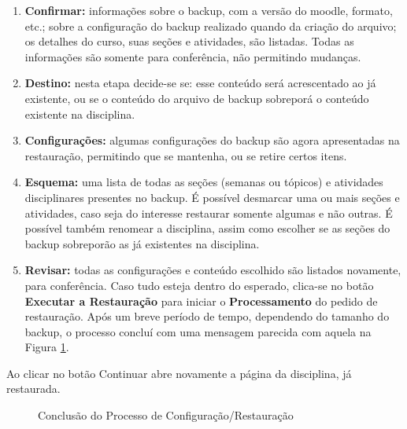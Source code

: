 \begin{enumerate}
 \item \textbf{Confirmar:} informações sobre o backup, com a versão do moodle, formato, etc.; sobre a configuração do backup realizado quando da criação do arquivo; os detalhes do curso, suas seções e atividades, são listadas. Todas as informações são somente para conferência, não permitindo mudanças.
 
 \item \textbf{Destino:} nesta etapa decide-se se:
esse conteúdo será acrescentado ao já existente, ou
se o conteúdo do arquivo de backup sobreporá o conteúdo existente na disciplina.

\item \textbf{Configurações:} algumas configurações do backup são agora apresentadas na restauração, permitindo que se mantenha, ou se retire certos itens.

\item \textbf{Esquema:} uma lista de todas as seções (semanas ou tópicos) e atividades disciplinares presentes no backup. É possível desmarcar uma ou mais seções e atividades, caso seja do interesse restaurar somente algumas e não outras. É possível também renomear a disciplina, assim como escolher se as seções do backup sobreporão as já existentes na disciplina.

\item \textbf{Revisar:} todas as configurações e conteúdo escolhido são listados novamente, para conferência. Caso tudo esteja dentro do esperado, clica-se no botão \textbf{Executar a Restauração} para iniciar o \textbf{Processamento} do pedido de restauração. 
Após um breve período de tempo, dependendo do tamanho do backup, o processo concluí com uma mensagem parecida com aquela na 
Figura \ref{Fig: fim}.
\end{enumerate}

Ao clicar no botão Continuar abre novamente a página da disciplina, já restaurada.


\begin{figure}[htbp]
 \begin{center}
  \caption{Conclusão do Processo de Configuração/Restauração}
  \label{Fig: fim}
 \end{center}
\end{figure}


